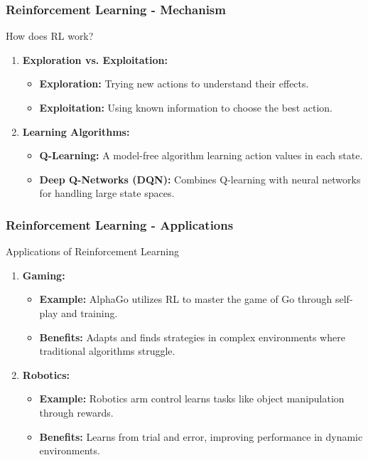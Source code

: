 \documentclass[aspectratio=169]{beamer}
\begin{document}
\begin{frame}[fragile]
    \frametitle{Reinforcement Learning - Mechanism}
    \begin{block}{How does RL work?}
        \begin{enumerate}
            \item \textbf{Exploration vs. Exploitation:}
                \begin{itemize}
                    \item \textbf{Exploration:} Trying new actions to understand their effects.
                    \item \textbf{Exploitation:} Using known information to choose the best action.
                \end{itemize}
            \item \textbf{Learning Algorithms:}
                \begin{itemize}
                    \item \textbf{Q-Learning:} A model-free algorithm learning action values in each state.
                    \item \textbf{Deep Q-Networks (DQN):} Combines Q-learning with neural networks for handling large state spaces.
                \end{itemize}
        \end{enumerate}
    \end{block}
\end{frame}

\begin{frame}[fragile]
    \frametitle{Reinforcement Learning - Applications}
    \begin{block}{Applications of Reinforcement Learning}
        \begin{enumerate}
            \item \textbf{Gaming:}
                \begin{itemize}
                    \item \textbf{Example:} AlphaGo utilizes RL to master the game of Go through self-play and training.
                    \item \textbf{Benefits:} Adapts and finds strategies in complex environments where traditional algorithms struggle.
                \end{itemize}
            \item \textbf{Robotics:}
                \begin{itemize}
                    \item \textbf{Example:} Robotics arm control learns tasks like object manipulation through rewards.
                    \item \textbf{Benefits:} Learns from trial and error, improving performance in dynamic environments.
                \end{itemize}
        \end{enumerate}
    \end{block}
\end{frame}
\end{document}
